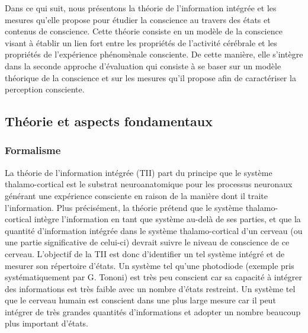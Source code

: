Dans ce qui suit, nous présentons la théorie de l'information intégrée et les mesures qu'elle propose pour étudier la conscience au travers des états et contenus de conscience.
Cette théorie consiste en un modèle de la conscience visant à établir un lien fort entre les propriétés de l'activité cérébrale et les propriétés de l'expérience phénomènale consciente. 
De cette manière, elle s'intègre dans la seconde approche d'évaluation qui consiste à se baser sur un modèle théorique de la conscience et sur les mesures qu'il propose afin de caractériser la perception consciente. 

\subsection{Théorie et aspects fondamentaux}
\label{theorieaspectsfondamentaux}

\subsubsection{Formalisme}
\label{theorieinfointegreeformalisme}

La théorie de l'information intégrée (TII) part du principe que le système thalamo-cortical est le substrat neuroanatomique pour les processus neuronaux générant une expérience consciente en raison de la manière dont il traite l'information. 
Plus précisément, la théorie prétend que le système thalamo-cortical intègre l'information en tant que système au-delà de ses parties, et que la quantité d'information intégrée dans le système thalamo-cortical d'un cerveau (ou une partie significative de celui-ci) devrait suivre le niveau de conscience de ce cerveau. 
L'objectif de la TII est donc d'identifier un tel système intégré et de mesurer son répertoire d'états. 
Un système tel qu'une photodiode (exemple pris systématiquement par G. Tononi) est très peu conscient car sa capacité à intégrer des informations est très faible avec un nombre d'états restreint. 
Un système tel que le cerveau humain est conscient dans une plus large mesure car il peut intégrer de très grandes quantités d'informations et adopter un nombre beaucoup plus important d'états. 

